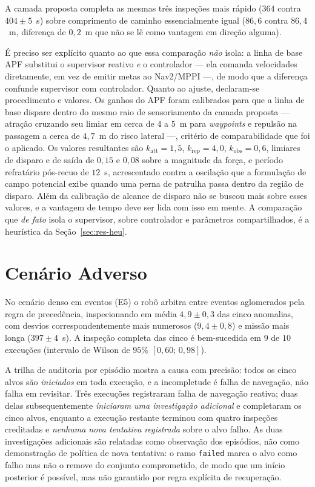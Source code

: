 A camada proposta completa as mesmas três inspeções mais rápido ($364$ contra
$404\pm5$~s) sobre comprimento de caminho essencialmente igual ($86{,}6$ contra
$86{,}4$~m, diferença de $0{,}2$~m que não se lê como vantagem em direção alguma).

É preciso ser explícito quanto ao que essa comparação \emph{não} isola: a linha de
base APF substitui o supervisor reativo \emph{e} o controlador --- ela comanda
velocidades diretamente, em vez de emitir metas ao Nav2/MPPI ---, de modo que a
diferença confunde supervisor com controlador. Quanto ao ajuste, declaram-se
procedimento e valores. Os ganhos do APF foram calibrados para que a linha de base
dispare dentro do mesmo raio de sensoriamento da camada proposta --- atração cruzando
seu limiar em cerca de $4$ a $5$~m para \textit{waypoints} e repulsão na passagem a
cerca de $4{,}7$~m do risco lateral ---, critério de comparabilidade que foi o
aplicado. Os valores resultantes são $k_{\text{att}}=1{,}5$, $k_{\text{rep}}=4{,}0$,
$k_{\text{obs}}=0{,}6$, limiares de disparo e de saída de $0{,}15$ e $0{,}08$ sobre a
magnitude da força, e período refratário pós-recuo de $12$~s, acrescentado contra a
oscilação que a formulação de campo potencial exibe quando uma perna de patrulha
passa dentro da região de disparo. Além da calibração de alcance de disparo não se
buscou mais sobre esses valores, e a vantagem de tempo deve ser lida com isso em
mente. A comparação que \emph{de fato} isola o supervisor, sobre controlador e
parâmetros compartilhados, é a heurística da Seção~\ref{sec:res-heu}.

\section{Cenário Adverso}
\label{sec:res-adverso}

No cenário denso em eventos (E5) o robô arbitra entre eventos aglomerados pela regra
de precedência, inspecionando em média $4{,}9\pm0{,}3$ das cinco anomalias, com
desvios correspondentemente mais numerosos ($9{,}4\pm0{,}8$) e missão mais longa
($397\pm4$~s). A inspeção completa das cinco é bem-sucedida em $9$ de $10$ execuções
(intervalo de Wilson de $95\%$ $[0{,}60;\,0{,}98]$).

A trilha de auditoria por episódio mostra a causa com precisão: todos os cinco alvos
são \emph{iniciados} em toda execução, e a incompletude é falha de navegação, não
falha em revisitar. Três execuções registraram falha de navegação reativa; duas delas
subsequentemente \emph{iniciaram uma investigação adicional} e completaram os cinco
alvos, enquanto a execução restante terminou com quatro inspeções creditadas e
\emph{nenhuma nova tentativa registrada} sobre o alvo falho. As duas investigações
adicionais são relatadas como observação dos episódios, não como demonstração de
política de nova tentativa: o ramo \texttt{failed} marca o alvo como falho mas não o
remove do conjunto comprometido, de modo que um início posterior é possível, mas não
garantido por regra explícita de recuperação.

